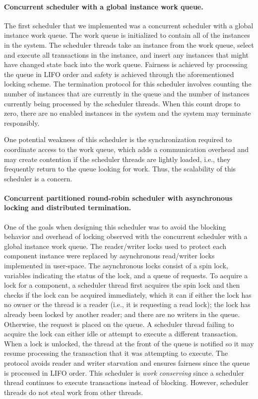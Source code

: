 \paragraph{Concurrent scheduler with a global instance work queue.}
The first scheduler that we implemented was a concurrent scheduler with a global instance work queue.
The work queue is initialized to contain all of the instances in the system.
The scheduler threads take an instance from the work queue, select and execute all transactions in the instance, and insert any instances that might have changed state back into the work queue.
Fairness is achieved by processing the queue in LIFO order and safety is achieved through the aforementioned locking scheme.
The termination protocol for this scheduler involves counting the number of instances that are currently in the queue and the number of instances currently being processed by the scheduler threads.
When this count drops to zero, there are no enabled instances in the system and the system may terminate responsibly.

One potential weakness of this scheduler is the synchronization required to coordinate access to the work queue, which adds a communication overhead and may create contention if the scheduler threads are lightly loaded, i.e., they frequently return to the queue looking for work.
Thus, the scalability of this scheduler is a concern.

\paragraph{Concurrent partitioned round-robin scheduler with asynchronous locking and distributed termination.}
One of the goals when designing this scheduler was to avoid the blocking behavior and overhead of locking observed with the concurrent scheduler with a global instance work queue.
The reader/writer locks used to protect each component instance were replaced by asynchronous read/writer locks implemented in user-space.
The asynchronous locks consist of a spin lock, variables indicating the status of the lock, and a queue of requests.
To acquire a lock for a component, a scheduler thread first acquires the spin lock and then checks if the lock can be acquired immediately, which it can if either the lock has no owner or the thread is a reader (i.e., it is requesting a read lock); the lock has already been locked by another reader; and there are no writers in the queue.
Otherwise, the request is placed on the queue.
A scheduler thread failing to acquire the lock can either idle or attempt to execute a different transaction.
When a lock is unlocked, the thread at the front of the queue is notified so it may resume processing the transaction that it was attempting to execute.
The protocol avoids reader and writer starvation and ensures fairness since the queue is processed in LIFO order.
This scheduler is \emph{work conserving} since a scheduler thread continues to execute transactions instead of blocking.
However, scheduler threads do not steal work from other threads.

